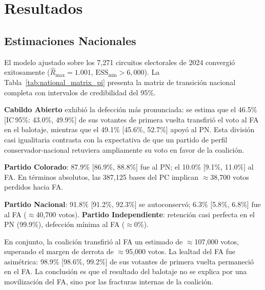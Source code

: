 
\section{Resultados}
\label{sec:resultados}

\subsection{Estimaciones Nacionales}
\label{sec:resultados_nacional}

El modelo ajustado sobre los 7{,}271 circuitos electorales de 2024 convergió exitosamente ($\hat{R}_{\max} = 1.001$, $\text{ESS}_{\min} > 6{,}000$). La Tabla~\ref{tab:national_matrix_pi} presenta la matriz de transición nacional completa con intervalos de credibilidad del 95\%.



\textbf{Cabildo Abierto} exhibió la defección más pronunciada: se estima que el 46.5\% [IC\,95\%: 43.0\%, 49.9\%] de sus votantes de primera vuelta transfirió el voto al FA en el balotaje, mientras que el 49.1\% [45.6\%, 52.7\%] apoyó al PN. Esta división casi igualitaria contrasta con la expectativa de que un partido de perfil conservador-nacional retuviera ampliamente su voto en favor de la coalición.

\textbf{Partido Colorado}: 87.9\% [86.9\%, 88.8\%] fue al PN; el 10.0\% [9.1\%, 11.0\%] al FA. En términos absolutos, las 387{,}125 bases del PC implican $\approx$38{,}700 votos perdidos hacia FA.

\textbf{Partido Nacional}: 91.8\% [91.2\%, 92.3\%] se autoconservó; 6.3\% [5.8\%, 6.8\%] fue al FA ($\approx$40{,}700 votos). \textbf{Partido Independiente}: retención casi perfecta en el PN (99.9\%), defección mínima al FA ($\approx$0\%).

En conjunto, la coalición transfirió al FA un estimado de $\approx$107{,}000 votos, superando el margen de derrota de $\approx$95{,}000 votos. La lealtad del FA fue asimétrica: 98.9\% [98.6\%, 99.2\%] de sus votantes de primera vuelta permaneció en el FA. La conclusión es que el resultado del balotaje no se explica por una movilización del FA, sino por las fracturas internas de la coalición.

